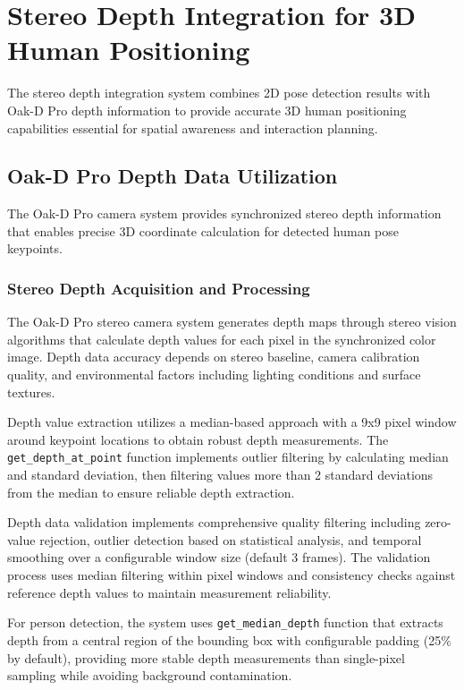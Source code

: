 \section{Stereo Depth Integration for 3D Human Positioning}

The stereo depth integration system combines 2D pose detection results with Oak-D Pro depth information to provide accurate 3D human positioning capabilities essential for spatial awareness and interaction planning.

\subsection{Oak-D Pro Depth Data Utilization}

The Oak-D Pro camera system provides synchronized stereo depth information that enables precise 3D coordinate calculation for detected human pose keypoints.

\subsubsection{Stereo Depth Acquisition and Processing}

The Oak-D Pro stereo camera system generates depth maps through stereo vision algorithms that calculate depth values for each pixel in the synchronized color image. Depth data accuracy depends on stereo baseline, camera calibration quality, and environmental factors including lighting conditions and surface textures.

Depth value extraction utilizes a median-based approach with a 9x9 pixel window around keypoint locations to obtain robust depth measurements. The \texttt{get\_depth\_at\_point} function implements outlier filtering by calculating median and standard deviation, then filtering values more than 2 standard deviations from the median to ensure reliable depth extraction.

Depth data validation implements comprehensive quality filtering including zero-value rejection, outlier detection based on statistical analysis, and temporal smoothing over a configurable window size (default 3 frames). The validation process uses median filtering within pixel windows and consistency checks against reference depth values to maintain measurement reliability.

For person detection, the system uses \texttt{get\_median\_depth} function that extracts depth from a central region of the bounding box with configurable padding (25\% by default), providing more stable depth measurements than single-pixel sampling while avoiding background contamination.

